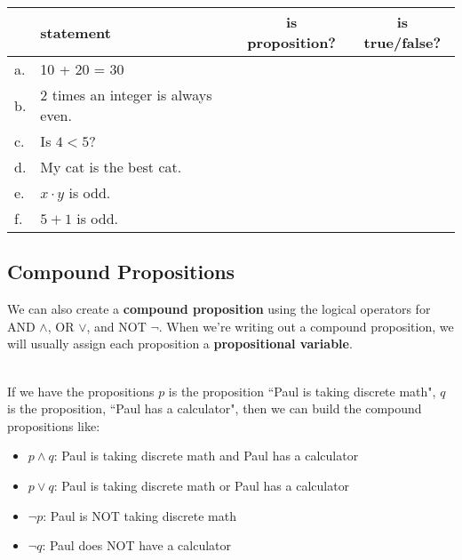 {\begin{questionNOGRADE}{\thequestion}
        \begin{center}
            \begin{tabular}{l l | c | c}
                & \textbf{statement} & \textbf{is proposition?} & \textbf{is true/false?}
                \\ \hline
                a. & 10 + 20 = 30
                & & \\
                
                b. & 2 times an integer is always even.
                & & \\

                c. & Is $4 < 5$?
                & & \\

                d. & My cat is the best cat.
                & & \\

                e. & $x \cdot y$ is odd.
                & & \\

                f. & $5 + 1$ is odd.
                & & \\
            \end{tabular}
        \end{center}

    \end{questionNOGRADE}

    \newpage

    \subsection{Compound Propositions}

    \begin{introNOHEAD}{}
        We can also create a \textbf{compound proposition} using the logical operators
        for AND $\land$, OR $\lor$, and NOT $\neg$. When we're writing out
        a compound proposition, we will usually assign each proposition a
        \textbf{propositional variable}.

        ~\\ If we have the propositions
        $p$ is the proposition ``Paul is taking discrete math",
        $q$ is the proposition, ``Paul has a calculator",
        then we can build the compound propositions like:
        \begin{itemize}
            \item[] $p \land q$: Paul is taking discrete math and Paul has a calculator
            \item[] $p \lor q$: Paul is taking discrete math or Paul has a calculator
            \item[] $\neg p$: Paul is NOT taking discrete math
            \item[] $\neg q$: Paul does NOT have a calculator
        \end{itemize}


\end{introNOHEAD}}

